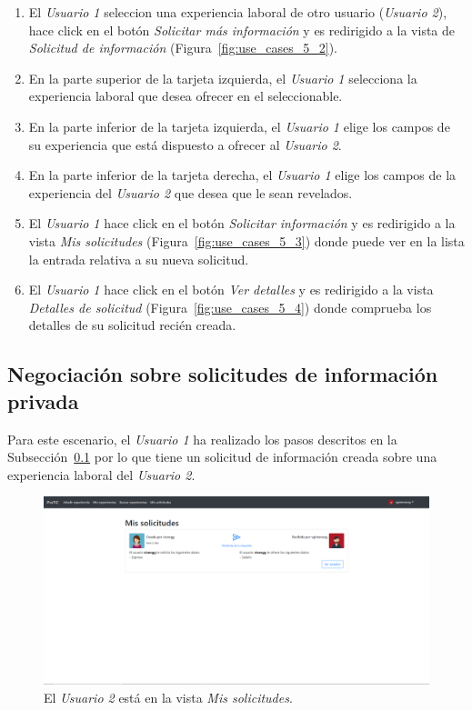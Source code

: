 \documentclass[a4paper, 12pt]{book}
\begin{document}
    \begin{enumerate}
        \item El \emph{Usuario 1} seleccion una experiencia laboral de otro usuario (\emph{Usuario 2}), hace click en el botón \emph{Solicitar más información}
        y es redirigido a la vista de \emph{Solicitud de información} (Figura~\ref{fig:use_cases_5_2}).
        \item En la parte superior de la tarjeta izquierda, el \emph{Usuario 1} selecciona la experiencia laboral que desea ofrecer en el seleccionable.
        \item En la parte inferior de la tarjeta izquierda, el \emph{Usuario 1} elige los campos de su experiencia que está dispuesto a ofrecer al \emph{Usuario 2}.
        \item En la parte inferior de la tarjeta derecha, el \emph{Usuario 1} elige los campos de la experiencia del \emph{Usuario 2} que desea que le sean revelados.
        \item El \emph{Usuario 1} hace click en el botón \emph{Solicitar información}
        y es redirigido a la vista \emph{Mis solicitudes} (Figura~\ref{fig:use_cases_5_3}) donde puede ver en la lista la entrada relativa a su nueva solicitud.
        \item El \emph{Usuario 1} hace click en el botón \emph{Ver detalles}
        y es redirigido a la vista \emph{Detalles de solicitud} (Figura~\ref{fig:use_cases_5_4}) donde comprueba los detalles de su solicitud recién creada.
    \end{enumerate}

    \subsection{Negociación sobre solicitudes de información privada}
    \label{subsec:search_work_experiences}
    Para este escenario, el \emph{Usuario 1} ha realizado los pasos descritos en la Subsección~\ref{subsec:search_work_experiences}
    por lo que tiene un solicitud de información creada sobre una experiencia laboral del \emph{Usuario 2}.

    \begin{figure}
        \centering
        \includegraphics[width=15cm, keepaspectratio]{img/6.1.png}
        \caption{El \emph{Usuario 2} está en la vista \emph{Mis solicitudes}.}
        \label{fig:use_cases_6_1}
    \end{figure}
\end{document}
